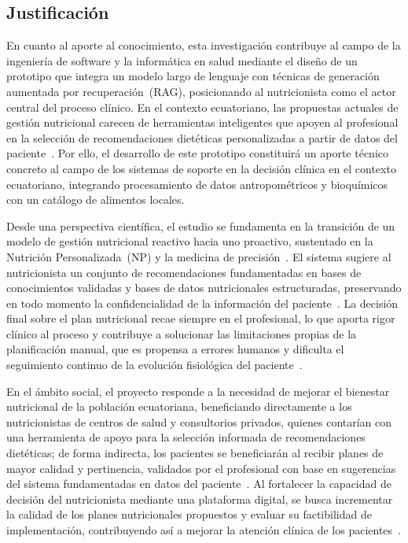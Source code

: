 \documentclass[12pt,a4paper]{article}
\begin{document}
\subsection{Justificación}

En cuanto al aporte al conocimiento, esta investigación contribuye al campo de
la ingeniería de software y la informática en salud mediante el diseño de un
prototipo que integra un modelo largo de lenguaje con técnicas de generación
aumentada por recuperación~(RAG), posicionando al nutricionista como el actor
central del proceso clínico. En el contexto ecuatoriano, las propuestas
actuales de gestión nutricional carecen de herramientas inteligentes que
apoyen al profesional en la selección de recomendaciones dietéticas
personalizadas a partir de datos del
paciente~\cite{vargas2025,quichimbo2021}. Por ello, el desarrollo de este
prototipo constituirá un aporte técnico concreto al campo de los sistemas de
soporte en la decisión clínica en el contexto ecuatoriano, integrando
procesamiento de datos antropométricos y bioquímicos con un catálogo de
alimentos locales.

Desde una perspectiva científica, el estudio se fundamenta en la transición de
un modelo de gestión nutricional reactivo hacia uno proactivo, sustentado en la
Nutrición Personalizada~(NP) y la medicina de
precisión~\cite{siddiqui2025,singar2024}. El sistema sugiere al nutricionista
un conjunto de recomendaciones fundamentadas en bases de conocimientos
validadas y bases de datos nutricionales estructuradas, preservando en todo
momento la confidencialidad de la información del
paciente~\cite{gavai2025,arshad2025}. La decisión final sobre el plan
nutricional recae siempre en el profesional, lo que aporta rigor clínico al
proceso y contribuye a solucionar las limitaciones propias de la planificación
manual, que es propensa a errores humanos y dificulta el seguimiento continuo
de la evolución fisiológica del paciente~\cite{mortazavi2023}.

En el ámbito social, el proyecto responde a la necesidad de mejorar el
bienestar nutricional de la población ecuatoriana, beneficiando directamente a
los nutricionistas de centros de salud y consultorios privados, quienes
contarían con una herramienta de apoyo para la selección informada de
recomendaciones dietéticas; de forma indirecta, los pacientes se beneficiarán
al recibir planes de mayor calidad y pertinencia, validados por el profesional
con base en sugerencias del sistema fundamentadas en datos del
paciente~\cite{ghose2021}. Al fortalecer la capacidad de decisión del
nutricionista mediante una plataforma digital, se busca incrementar la calidad
de los planes nutricionales propuestos y evaluar su factibilidad de
implementación, contribuyendo así a mejorar la atención clínica de los
pacientes~\cite{abeltino2025,ebadi2025}.
\end{document}
